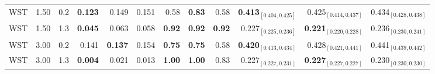 \begin{table}[!h]
\begin{tabular}[t]{lrrrrrrrrrrr}
WST & 1.50 & 0.2 & \textbf{0.123} & 0.149 & 0.151 & 0.58 & \textbf{0.83} & 0.58 & \textbf{0.413$_{[0.404,0.425]}$} & 0.425$_{[0.414,0.437]}$ & 0.434$_{[0.428,0.438]}$\\
WST & 1.50 & 1.3 & \textbf{0.045} & 0.063 & 0.058 & \textbf{0.92} & \textbf{0.92} & \textbf{0.92} & 0.227$_{[0.225,0.236]}$ & \textbf{0.221$_{[0.220,0.228]}$} & 0.236$_{[0.230,0.241]}$\\
WST & 3.00 & 0.2 & 0.141 & \textbf{0.137} & 0.154 & \textbf{0.75} & \textbf{0.75} & 0.58 & \textbf{0.420$_{[0.413,0.434]}$} & 0.428$_{[0.421,0.441]}$ & 0.441$_{[0.439,0.442]}$\\
WST & 3.00 & 1.3 & \textbf{0.004} & 0.021 & 0.013 & \textbf{1.00} & \textbf{1.00} & 0.83 & 0.227$_{[0.227,0.231]}$ & \textbf{0.227$_{[0.227,0.227]}$} & 0.230$_{[0.230,0.230]}$\\
\bottomrule
\end{tabular}
\end{table}
